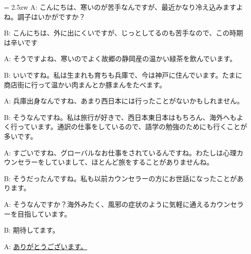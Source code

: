 \documentclass[11pt]{amsart}
\title{}
\author{}
\newenvironment{hangall}[1]{\hangindent = 2.5zw\everypar{\hangindent = 2.5zw}}{}
\begin{document}
\maketitle
\begin{hangall}{}%
A: こんにちは、寒いのが苦手なんですが、最近かなり冷え込みますよね。調子はいかがですか？

B: こんにちは、外に出にくいですが、じっとしてるのも苦手なので、この時期は辛いです

A: そうですよね、寒いのでよく故郷の静岡産の温かい緑茶を飲んでいます。

B: いいですね。私は生まれも育ちも兵庫で、今は神戸に住んでいます。たまに商店街に行って温かい肉まんとか豚まんをたべます。

A: 兵庫出身なんですね、あまり西日本には行ったことがないかもしれません。

B: そうなんですね。私は旅行が好きで、西日本東日本はもちろん、海外へもよく行っています。通訳の仕事をしているので、語学の勉強のためにも行くことが多いです。

A: すごいですね、グローバルなお仕事をされているんですね。わたしは心理カウンセラーをしていまして、ほとんど旅をすることがありませんね。

B: そうだったんですね。私も以前カウンセラーの方にお世話になったことがあります。

A: そうなんですか？海外みたく、風邪の症状のように気軽に通えるカウンセラーを目指しています。

B: 期待してます。

A: \ul{ありがとうございます。}\end{hangall}
\end{document}
